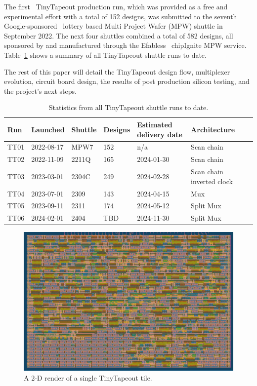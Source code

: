 The first~\cite{firstshuttle} TinyTapeout production run, which was provided as a free and experimental effort with a total of 152 designs, was submitted to the seventh Google-sponsored~\cite{googlesponsored} lottery based Multi Project Wafer (MPW) shuttle in September 2022.
The next four shuttles combined a total of 582 designs, all sponsored by and manufactured through the Efabless~\cite{efabless} chipIgnite MPW service. Table~\ref{tab:tinytapeout} shows a summary of all TinyTapeout shuttle runs to date.

The rest of this paper will detail the TinyTapeout design flow, multiplexer evolution, circuit board design, the results of post production silicon testing, and the project's next steps.

\begin{table}[!t]
\centering
\caption{Statistics from all TinyTapeout shuttle runs to date.}
\label{tab:tinytapeout}
\begin{tabularx}{\textwidth}{@{}l *{6}{X}@{}}
\toprule
\textbf{Run} & \textbf{Launched} & \textbf{Shuttle} & \textbf{Designs} & \textbf{Estimated delivery date} & \textbf{Architecture} \\
\midrule
TT01 & 2022-08-17  & MPW7  & 152 & n/a        & Scan chain \\
TT02 & 2022-11-09  & 2211Q & 165 & 2024-01-30 & Scan chain \\
TT03 & 2023-03-01  & 2304C & 249 & 2024-02-28 & Scan chain inverted clock \\
TT04 & 2023-07-01  & 2309  & 143 & 2024-04-15 & Mux \\
TT05 & 2023-09-11  & 2311  & 174 & 2024-05-12 & Split Mux \\
TT06 & 2024-02-01  & 2404  & TBD & 2024-11-30 & Split Mux \\
\bottomrule
\end{tabularx}
\end{table}

\begin{figure}[!t]
\centering
\includegraphics[width=\columnwidth]{./Figs/gh action gds layout.png}
\caption{A 2-D render of a single TinyTapeout tile.}
\label{fig:render_cells_in_use}
\end{figure}

